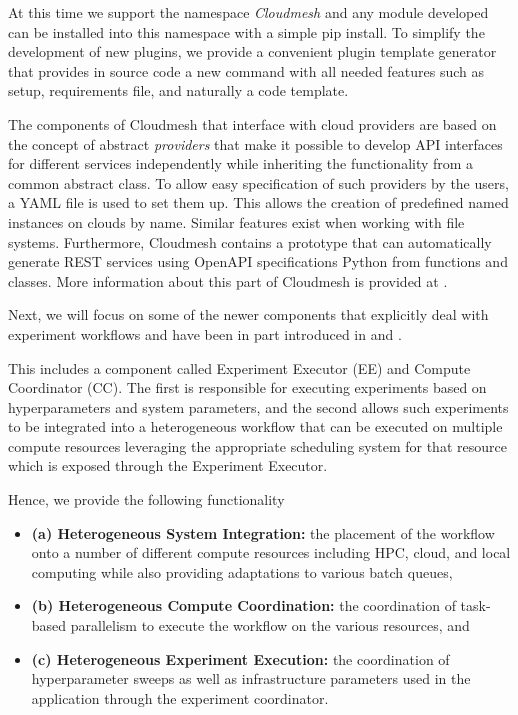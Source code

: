 \documentclass[utf8]{FrontiersinVancouver} %
\begin{document}
At this time we support the namespace {\em Cloudmesh} and any module developed can be installed into this namespace with a simple pip install. To simplify the development of new plugins, we provide a convenient plugin template generator that provides in source code a new command with all needed features such as setup, requirements file, and naturally a code template. 

The components of Cloudmesh that interface with cloud providers are based on the concept of abstract {\em providers} that make it possible to develop API interfaces for different services independently while inheriting the functionality from a common abstract class. To allow easy specification of such providers by the users, a YAML file is used to set them up. This allows the creation of predefined named instances on clouds by name. Similar features exist when working with file systems.
Furthermore, Cloudmesh contains a prototype that can automatically generate REST services using OpenAPI specifications Python from functions and classes. 
More information about this part of Cloudmesh is provided at \citep{www-cloudmesh-org}.

Next, we will focus on some of the newer components that explicitly deal with experiment workflows
and have been in part introduced in 
\citep{las-2022-hybrid} and
\citep{las-2022-templated}.


This includes a component called Experiment Executor (EE) and Compute Coordinator (CC). The first is responsible for executing experiments based on hyperparameters and system parameters, and the second allows such experiments to be integrated into a heterogeneous workflow that can be executed on multiple compute resources leveraging the appropriate scheduling system for that resource which is exposed through the Experiment Executor.

Hence, we provide the following functionality 

\begin{itemize}
\item {\bf (a) Heterogeneous System Integration:} the placement
of the workflow onto a number of different compute resources
including HPC, cloud, and local computing while also providing adaptations to various batch queues, 
\item {\bf  (b) Heterogeneous Compute Coordination:} the coordination of task-based parallelism to execute
the workflow on the various resources, and 
\item  {\bf (c) Heterogeneous Experiment
Execution:} the coordination of hyperparameter sweeps as well as infrastructure parameters used
in the application through the experiment coordinator.  

\end{itemize}
\end{document}
